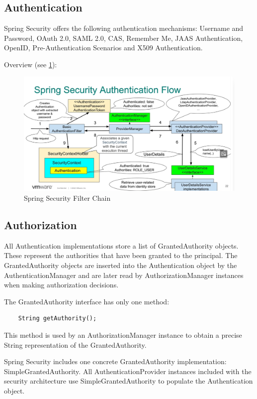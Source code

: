 \documentclass{scrartcl}
\begin{document}
\subsection{Authentication}

Spring Security offers the following authentication mechanisms: Username and Password, OAuth 2.0, SAML 2.0, CAS, Remember Me, JAAS Authentication, OpenID, Pre-Authentication Scenarios and X509 Authentication.

Overview (see \ref{fig:authentication}):

\begin{figure}[h]
    \centering
    \includegraphics[width=1\linewidth]{authentication}
    \caption{Spring Security Filter Chain}
    \label{fig:authentication}
\end{figure}
\subsection{Authorization}

All Authentication implementations store a list of GrantedAuthority objects. These represent the authorities that have been granted to the principal. The GrantedAuthority objects are inserted into the Authentication object by the AuthenticationManager and are later read by AuthorizationManager instances when making authorization decisions.

The GrantedAuthority interface has only one method:

\begin{lstlisting}
    String getAuthority();
\end{lstlisting}

This method is used by an AuthorizationManager instance to obtain a precise String representation of the GrantedAuthority.

Spring Security includes one concrete GrantedAuthority implementation: SimpleGrantedAuthority. All AuthenticationProvider instances included with the security architecture use SimpleGrantedAuthority to populate the Authentication object.
\end{document}
